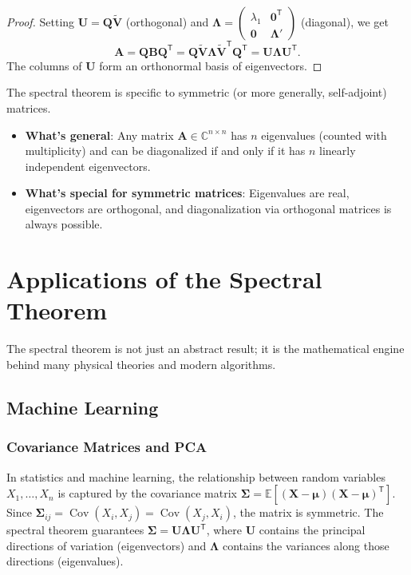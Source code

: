 \begin{proof}
  Setting $\mathbf{U} = \mathbf{Q}\widetilde{\mathbf{V}}$ (orthogonal) and $\mathbf{\Lambda} = \begin{pmatrix} \lambda_1 & \mathbf{0}^{\mathsf{T}} \\ \mathbf{0} & \mathbf{\Lambda}' \end{pmatrix}$ (diagonal), we get
  \[
    \mathbf{A} = \mathbf{Q} \mathbf{B} \mathbf{Q}^{\mathsf{T}} = \mathbf{Q} \widetilde{\mathbf{V}} \mathbf{\Lambda} \widetilde{\mathbf{V}}^{\mathsf{T}} \mathbf{Q}^{\mathsf{T}} = \mathbf{U} \mathbf{\Lambda} \mathbf{U}^{\mathsf{T}}.
  \]
  The columns of $\mathbf{U}$ form an orthonormal basis of eigenvectors.
\end{proof}

\begin{remark}
  The spectral theorem is specific to symmetric (or more generally, self-adjoint) matrices.
  \begin{itemize}
    \item \textbf{What's general}: Any matrix $\mathbf{A} \in \mathbb{C}^{n \times n}$ has $n$ eigenvalues (counted with multiplicity) and can be diagonalized if and only if it has $n$ linearly independent eigenvectors.
    \item \textbf{What's special for symmetric matrices}: Eigenvalues are real, eigenvectors are orthogonal, and diagonalization via orthogonal matrices is always possible.
  \end{itemize}
\end{remark}

\section{Applications of the Spectral Theorem}

The spectral theorem is not just an abstract result; it is the mathematical engine behind many physical theories and modern algorithms.

\subsection{Machine Learning}

\subsubsection{Covariance Matrices and PCA}
In statistics and machine learning, the relationship between random variables $X_1, \dots, X_n$ is captured by the covariance matrix $\mathbf{\Sigma} = \mathbb{E}[(\mathbf{X} - \boldsymbol{\mu})(\mathbf{X} - \boldsymbol{\mu})^{\mathsf{T}}]$.
Since $\mathbf{\Sigma}_{ij} = \operatorname{Cov}(X_i, X_j) = \operatorname{Cov}(X_j, X_i)$, the matrix is symmetric.
The spectral theorem guarantees $\mathbf{\Sigma} = \mathbf{U}\mathbf{\Lambda}\mathbf{U}^{\mathsf{T}}$, where $\mathbf{U}$ contains the principal directions of variation (eigenvectors) and $\mathbf{\Lambda}$ contains the variances along those directions (eigenvalues).


